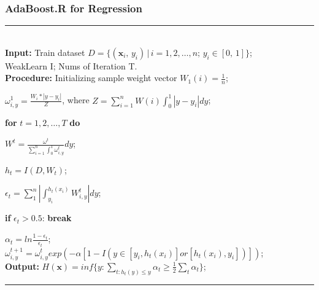 \documentclass[usenames,dvipsnames]{beamer}
\begin{document}
\begin{frame}
\frametitle{AdaBoost.R for Regression}
\noindent\rule[0.1\baselineskip]{\textwidth}{0.75pt}\\
\textbf{Input:} Train dataset $D = \{(\textbf{x}_i,\,y_i)\,|\,i = 1, 2,\dots, n;\, y_i \in [0,\,1]\}$;\\
\hspace*{32pt} WeakLearn I; Nums of Iteration T.\\
\textbf{Procedure:} 
    \hspace*{2pt} Initializing sample weight vector $W_1(i) = \frac{1}{n}$;\par
    \hspace*{24pt}$\omega_{i,y}^1 = \frac{W_i*|y-y_i|}{Z}$, where $Z = \sum_{i=1}^{n}W(i)\int_{0}^{1}|y-y_i|dy$; \par
    \hspace*{20pt} \textbf{for} $t = 1, 2,\dots, T$ \textbf{do}\par
        \hspace*{36pt} $W^t = \frac{\omega^t}{\sum_{i=1}^{n}\int_{0}^{1}\omega_{i,y}^t}dy$;\par
        \hspace*{36pt} $h_t = I(D, W_t)$;\par
        \hspace*{36pt} $\epsilon_t = \sum_{1}^{n}|\int_{y_i}^{h_t(x_i)}W_{i,y}^{t}|dy$;\par
        \hspace*{36pt} \textbf{if} $\epsilon_t > 0.5$: \textbf{break}\par
        \hspace*{36pt} $\alpha_t = ln\frac{1-\epsilon_t}{\epsilon_t}$;\\
        \hspace*{36pt} $\omega_{i,y}^{t+1} = \omega_{i,y}^{t}exp(-\alpha[1-I(y\in[y_i, h_t(x_i)] or [h_t(x_i),y_i])]) $;\\
\textbf{Output:} $H(\textbf{x}) = inf \{y:\sum_{t:h_t(y)\leq y}\alpha_t \geq \frac{1}{2}\sum_t \alpha_t\}$;\par
\noindent\rule[0.1\baselineskip]{\textwidth}{0.75pt}
\end{frame}
\end{document}
